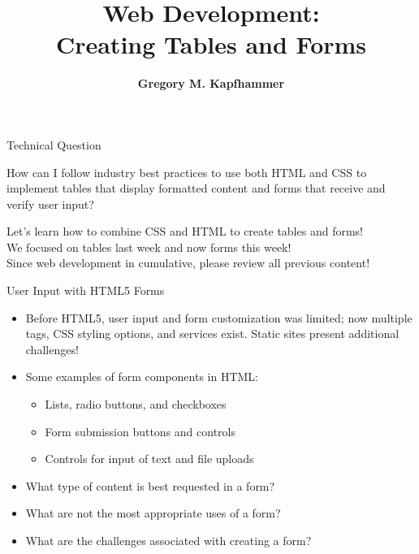 \documentclass[14pt,aspectratio=169]{beamer}
\title{Web Development: \\ Creating Tables and Forms}
\author{{\bf Gregory M. Kapfhammer}}
\institute[shortinst]{{\bf Department of Computer Science, Allegheny College}}
\begin{document}
{
  \begin{frame}
    \titlepage
  \end{frame}
}

%
\begin{frame}{Technical Question}
  \hspace*{.25in}
  \vspace*{.1in}
  \begin{minipage}{4.5in}
  \begin{center}
    {\large How can I follow industry best practices to use both HTML and CSS to
    implement tables that display formatted content and forms that receive and
  verify user input?}
  \end{center}
  \end{minipage}
  \vspace{2ex}
  \begin{center}
    \small Let's learn how to combine CSS and HTML to create tables and forms!\\
    \small We focused on tables last week and now forms this week!\\
    \small Since web development in cumulative, please review all previous content!\\
  \end{center}
\end{frame}

%
\begin{frame}{User Input with HTML5 Forms}
  \begin{itemize}
    \item Before HTML5, user input and form customization was limited; now
      multiple tags, CSS styling options, and services exist. Static sites
      present additional challenges!
      \vspace*{-.15in}
    \item Some examples of form components in HTML:
      \begin{itemize}
        \item Lists, radio buttons, and checkboxes
        \item Form submission buttons and controls
        \item Controls for input of text and file uploads
      \end{itemize}
      \vspace*{-.2in}
    \item What type of content is best requested in a form?
      \vspace*{-.2in}
    \item What are not the most appropriate uses of a form?
      \vspace*{-.2in}
    \item What are the challenges associated with creating a form?
  \end{itemize}
\end{frame}
\end{document}
